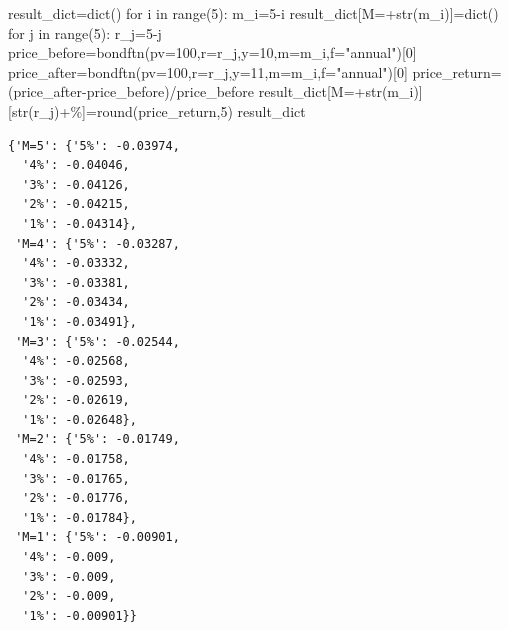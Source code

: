 \documentclass[
  letterpaper,
  DIV=11,
  numbers=noendperiod]{scrreprt}
\newenvironment{Shaded}{\begin{snugshade}}{\end{snugshade}}
\newcommand{\BuiltInTok}[1]{\textcolor[rgb]{0.00,0.23,0.31}{#1}}
\newcommand{\ControlFlowTok}[1]{\textcolor[rgb]{0.00,0.23,0.31}{#1}}
\newcommand{\DecValTok}[1]{\textcolor[rgb]{0.68,0.00,0.00}{#1}}
\newcommand{\KeywordTok}[1]{\textcolor[rgb]{0.00,0.23,0.31}{#1}}
\newcommand{\NormalTok}[1]{\textcolor[rgb]{0.00,0.23,0.31}{#1}}
\newcommand{\OperatorTok}[1]{\textcolor[rgb]{0.37,0.37,0.37}{#1}}
\newcommand{\StringTok}[1]{\textcolor[rgb]{0.13,0.47,0.30}{#1}}
\begin{document}
\begin{Shaded}
\begin{Highlighting}[]
\NormalTok{result\_dict}\OperatorTok{=}\BuiltInTok{dict}\NormalTok{()}
\ControlFlowTok{for}\NormalTok{ i }\KeywordTok{in} \BuiltInTok{range}\NormalTok{(}\DecValTok{5}\NormalTok{):}
\NormalTok{    m\_i}\OperatorTok{=}\DecValTok{5}\OperatorTok{{-}}\NormalTok{i}
\NormalTok{    result\_dict[}\StringTok{\textquotesingle{}M=\textquotesingle{}}\OperatorTok{+}\BuiltInTok{str}\NormalTok{(m\_i)]}\OperatorTok{=}\BuiltInTok{dict}\NormalTok{()}
    \ControlFlowTok{for}\NormalTok{ j }\KeywordTok{in} \BuiltInTok{range}\NormalTok{(}\DecValTok{5}\NormalTok{):}
\NormalTok{        r\_j}\OperatorTok{=}\DecValTok{5}\OperatorTok{{-}}\NormalTok{j}
\NormalTok{        price\_before}\OperatorTok{=}\NormalTok{bondftn(pv}\OperatorTok{=}\DecValTok{100}\NormalTok{,r}\OperatorTok{=}\NormalTok{r\_j,y}\OperatorTok{=}\DecValTok{10}\NormalTok{,m}\OperatorTok{=}\NormalTok{m\_i,f}\OperatorTok{=}\StringTok{"annual"}\NormalTok{)[}\DecValTok{0}\NormalTok{]}
\NormalTok{        price\_after}\OperatorTok{=}\NormalTok{bondftn(pv}\OperatorTok{=}\DecValTok{100}\NormalTok{,r}\OperatorTok{=}\NormalTok{r\_j,y}\OperatorTok{=}\DecValTok{11}\NormalTok{,m}\OperatorTok{=}\NormalTok{m\_i,f}\OperatorTok{=}\StringTok{"annual"}\NormalTok{)[}\DecValTok{0}\NormalTok{]}
\NormalTok{        price\_return}\OperatorTok{=}\NormalTok{(price\_after}\OperatorTok{{-}}\NormalTok{price\_before)}\OperatorTok{/}\NormalTok{price\_before}
\NormalTok{        result\_dict[}\StringTok{\textquotesingle{}M=\textquotesingle{}}\OperatorTok{+}\BuiltInTok{str}\NormalTok{(m\_i)][}\BuiltInTok{str}\NormalTok{(r\_j)}\OperatorTok{+}\StringTok{\textquotesingle{}\%\textquotesingle{}}\NormalTok{]}\OperatorTok{=}\BuiltInTok{round}\NormalTok{(price\_return,}\DecValTok{5}\NormalTok{)}
\NormalTok{result\_dict}
\end{Highlighting}
\end{Shaded}

\begin{verbatim}
{'M=5': {'5%': -0.03974,
  '4%': -0.04046,
  '3%': -0.04126,
  '2%': -0.04215,
  '1%': -0.04314},
 'M=4': {'5%': -0.03287,
  '4%': -0.03332,
  '3%': -0.03381,
  '2%': -0.03434,
  '1%': -0.03491},
 'M=3': {'5%': -0.02544,
  '4%': -0.02568,
  '3%': -0.02593,
  '2%': -0.02619,
  '1%': -0.02648},
 'M=2': {'5%': -0.01749,
  '4%': -0.01758,
  '3%': -0.01765,
  '2%': -0.01776,
  '1%': -0.01784},
 'M=1': {'5%': -0.00901,
  '4%': -0.009,
  '3%': -0.009,
  '2%': -0.009,
  '1%': -0.00901}}
\end{verbatim}
\end{document}
